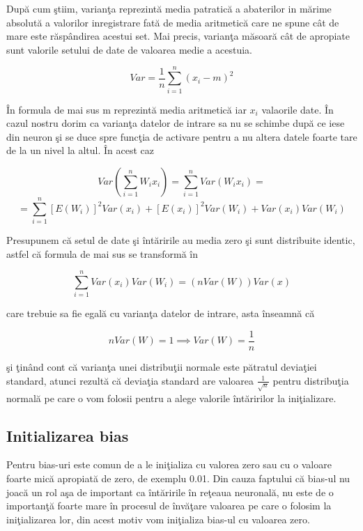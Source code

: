 Dup\u{a} cum \c{s}tiim, varian\c{t}a reprezint\u{a} media patratic\u{a} a abaterilor in m\u{a}rime absolut\u{a} a valorilor inregistrare fat\u{a} de media aritmetic\u{a} care ne spune c\^{a}t de mare este r\u{a}sp\^{a}ndirea  acestui set. Mai precis, varian\c{t}a m\u{a}soar\u{a} c\^{a}t de apropiate sunt valorile setului de date de valoarea medie a acestuia.

$$Var = \frac{1}{n} \sum_{i=1}^{n} (x_i - m )^2 $$

\^{I}n formula de mai sus m reprezint\u{a} media aritmetic\u{a} iar $x_i$ valaorile date. \^{I}n cazul nostru dorim ca varian\c{t}a datelor de intrare sa nu se schimbe dup\u{a} ce iese din neuron \c{s}i se duce spre func\c{t}ia de activare pentru a nu altera datele foarte tare de la un nivel la altul. \^{I}n acest caz

$$Var(\sum_{i=1}^{n} W_i x_i) = \sum_{i=1}^{n} Var(W_i x_i) = $$
$$ = \sum_{i=1}^{n} [E(W_i)]^2 Var(x_i) + [E(x_i)]^2 Var(W_i) + Var(x_i) Var(W_i)$$

Presupunem c\u{a} setul de date \c{s}i \^{i}nt\u{a}ririle au media zero \c{s}i sunt distribuite identic, astfel c\u{a} formula de mai sus se transform\u{a} \^{i}n

$$\sum_{i=1}^{n} Var(x_i) Var(W_i) = (n Var(W)) Var(x)$$

care trebuie sa fie egal\u{a} cu varian\c{t}a datelor de intrare, asta \^{i}nseamn\u{a} c\u{a} 

$$n Var(W) = 1 \implies Var(W) =  \frac{1}{n} $$

\c{s}i \c{t}in\^{a}nd cont c\u{a} varian\c{t}a unei distribu\c{t}ii normale este p\u{a}tratul devia\c{t}iei standard, atunci rezult\u{a} c\u{a} devia\c{t}ia standard are valoarea $\frac{1}{\sqrt{n}}$ pentru distribu\c{t}ia normal\u{a} pe care o vom folosii pentru a alege valorile \^{i}nt\u{a}ririlor la ini\c{t}ializare.

\subsection{Initializarea bias}

Pentru bias-uri este comun de a le ini\c{t}ializa cu valorea zero sau cu o valoare foarte mic\u{a} apropiat\u{a} de zero, de exemplu 0.01. Din cauza faptului c\u{a} bias-ul nu joac\u{a} un rol a\c{s}a de important ca \^{i}nt\u{a}ririle \^{i}n re\c{t}eaua neuronal\u{a}, nu este de o importan\c{t}\u{a} foarte mare \^{i}n procesul de \^{i}nv\u{a}\c{t}are valoarea pe care o folosim la ini\c{t}ializarea lor, din acest motiv vom ini\c{t}ializa bias-ul cu valoarea zero.